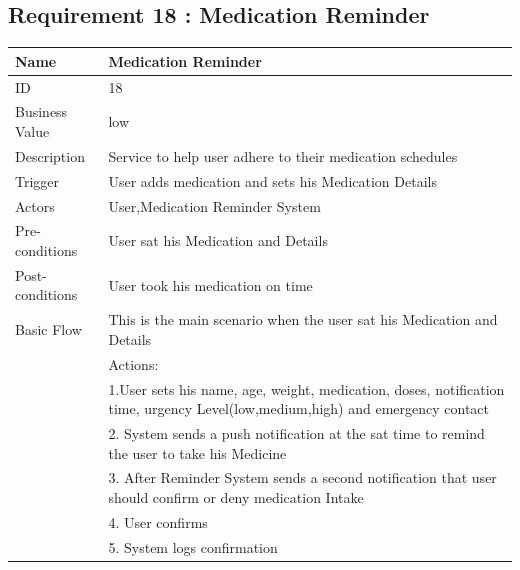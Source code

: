 \documentclass{article}
\begin{document}
\clearpage


\subsection{Requirement 18 : Medication Reminder}


\begin{table}[h!]
    \begin{tabularx}{\textwidth}{|>{\raggedright\arraybackslash}p{}|X|}
        \hline
        Name             & Medication Reminder                                \\ \hline
        ID               & 18                                                                                     \\ \hline
        Business Value   & low                                                                                  \\ \hline
        Description      & Service to help user adhere to their medication schedules  \\ \hline
        Trigger          & User adds medication and sets his Medication Details\\ \hline
        Actors           & User,Medication Reminder System                               \\ \hline
        Pre-conditions   & User sat his Medication and Details                                    \\ \hline
        Post-conditions  & User took his medication on time                                                   \\ \hline
        Basic Flow       & This is the main scenario when the user sat his Medication and Details \\ \hline
                         & Actions: \\
                         & 1.User sets his name, age, weight, medication, doses, notification time, urgency Level(low,medium,high) and emergency contact\\
                         & 2. System sends a push notification at the sat time to remind the user to take his Medicine \\
                         & 3. After Reminder System sends a second notification that user should confirm or deny medication Intake\\
                         & 4. User confirms \\
                         & 5. System logs confirmation \\ \hline

\end{tabularx}
\end{table}
\end{document}
